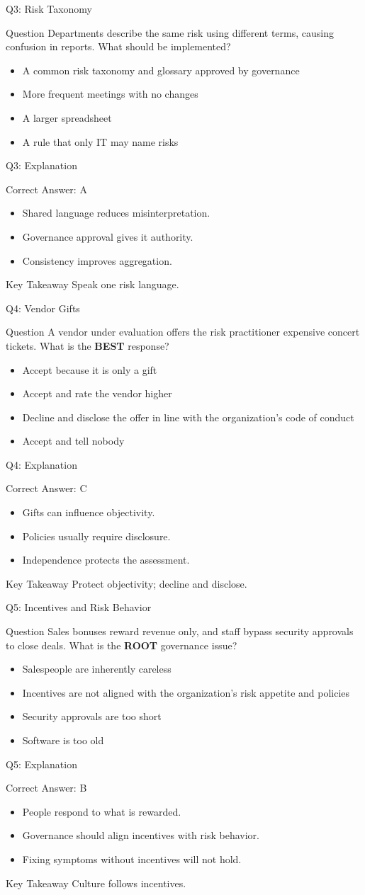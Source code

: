 \documentclass[aspectratio=169]{beamer}
\newcommand{\hq}[7]{%
	\begin{frame}{Q#1: #2}
		\begin{block}{Question}
			#3
		\end{block}
		\begin{itemize}
			#4
		\end{itemize}
	\end{frame}
	\begin{frame}{Q#1: Explanation}
		\begin{block}{Correct Answer: #5}
			\begin{itemize}
				#6
			\end{itemize}
		\end{block}
		\begin{alertblock}{Key Takeaway}
			#7
		\end{alertblock}
	\end{frame}
}
\begin{document}
	\hq{3}{Risk Taxonomy}
	{Departments describe the same risk using different terms, causing confusion in reports. What should be implemented?}
	{\item[\textbf{(A)}] A common risk taxonomy and glossary approved by governance
		\item[\textbf{(B)}] More frequent meetings with no changes
		\item[\textbf{(C)}] A larger spreadsheet
		\item[\textbf{(D)}] A rule that only IT may name risks}
	{A}
	{\item Shared language reduces misinterpretation.
		\item Governance approval gives it authority.
		\item Consistency improves aggregation.}
	{Speak one risk language.}
	
	\hq{4}{Vendor Gifts}
	{A vendor under evaluation offers the risk practitioner expensive concert tickets. What is the \textbf{BEST} response?}
	{\item[\textbf{(A)}] Accept because it is only a gift
		\item[\textbf{(B)}] Accept and rate the vendor higher
		\item[\textbf{(C)}] Decline and disclose the offer in line with the organization's code of conduct
		\item[\textbf{(D)}] Accept and tell nobody}
	{C}
	{\item Gifts can influence objectivity.
		\item Policies usually require disclosure.
		\item Independence protects the assessment.}
	{Protect objectivity; decline and disclose.}
	
	\hq{5}{Incentives and Risk Behavior}
	{Sales bonuses reward revenue only, and staff bypass security approvals to close deals. What is the \textbf{ROOT} governance issue?}
	{\item[\textbf{(A)}] Salespeople are inherently careless
		\item[\textbf{(B)}] Incentives are not aligned with the organization's risk appetite and policies
		\item[\textbf{(C)}] Security approvals are too short
		\item[\textbf{(D)}] Software is too old}
	{B}
	{\item People respond to what is rewarded.
		\item Governance should align incentives with risk behavior.
		\item Fixing symptoms without incentives will not hold.}
	{Culture follows incentives.}
	
\end{document}
